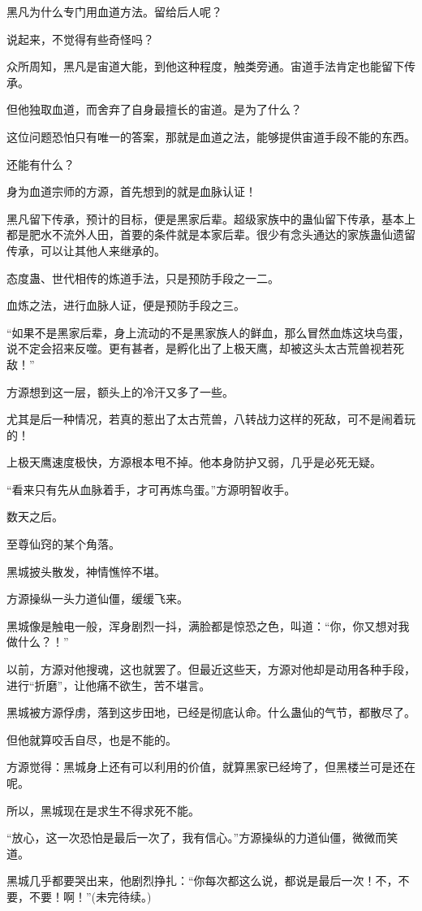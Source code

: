 \begin{this_body}
黑凡为什么专门用血道方法。留给后人呢？

说起来，不觉得有些奇怪吗？

众所周知，黑凡是宙道大能，到他这种程度，触类旁通。宙道手法肯定也能留下传承。

但他独取血道，而舍弃了自身最擅长的宙道。是为了什么？

这位问题恐怕只有唯一的答案，那就是血道之法，能够提供宙道手段不能的东西。

还能有什么？

身为血道宗师的方源，首先想到的就是血脉认证！

黑凡留下传承，预计的目标，便是黑家后辈。超级家族中的蛊仙留下传承，基本上都是肥水不流外人田，首要的条件就是本家后辈。很少有念头通达的家族蛊仙遗留传承，可以让其他人来继承的。

态度蛊、世代相传的炼道手法，只是预防手段之一二。

血炼之法，进行血脉人证，便是预防手段之三。

“如果不是黑家后辈，身上流动的不是黑家族人的鲜血，那么冒然血炼这块鸟蛋，说不定会招来反噬。更有甚者，是孵化出了上极天鹰，却被这头太古荒兽视若死敌！”

方源想到这一层，额头上的冷汗又多了一些。

尤其是后一种情况，若真的惹出了太古荒兽，八转战力这样的死敌，可不是闹着玩的！

上极天鹰速度极快，方源根本甩不掉。他本身防护又弱，几乎是必死无疑。

“看来只有先从血脉着手，才可再炼鸟蛋。”方源明智收手。

数天之后。

至尊仙窍的某个角落。

黑城披头散发，神情憔悴不堪。

方源操纵一头力道仙僵，缓缓飞来。

黑城像是触电一般，浑身剧烈一抖，满脸都是惊恐之色，叫道：“你，你又想对我做什么？！”

以前，方源对他搜魂，这也就罢了。但最近这些天，方源对他却是动用各种手段，进行“折磨”，让他痛不欲生，苦不堪言。

黑城被方源俘虏，落到这步田地，已经是彻底认命。什么蛊仙的气节，都散尽了。

但他就算咬舌自尽，也是不能的。

方源觉得：黑城身上还有可以利用的价值，就算黑家已经垮了，但黑楼兰可是还在呢。

所以，黑城现在是求生不得求死不能。

“放心，这一次恐怕是最后一次了，我有信心。”方源操纵的力道仙僵，微微而笑道。

黑城几乎都要哭出来，他剧烈挣扎：“你每次都这么说，都说是最后一次！不，不要，不要！啊！”(未完待续。)

\end{this_body}

